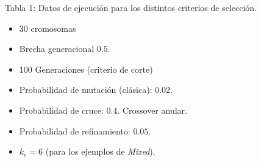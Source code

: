 \documentclass[%
    final,
    reprint,
    notitlepage,
    narroweqnarray,
    inline,
    twoside,
    invited
    ]{ieee}
\begin{document}
\vspace{10px}

\begin{center} 
\par Tabla 1: Datos de ejecución para los distintos criterios de selección.\\
\vspace{5px}
\begin{itemize}
\centering
\item 30 cromosomas
\item Brecha generacional $0.5$.
\item 100 Generaciones (criterio de corte)
\item Probabilidad de mutación (clásica): $0.02$.
\item Probabilidad de cruce: $0.4$. Crossover anular.
\item Probabilidad de refinamiento: $0.05$.
\item $k_e = 6$ (para los ejemplos de \textit{Mixed}).
\end{itemize}
\end{center}

\end{document}
